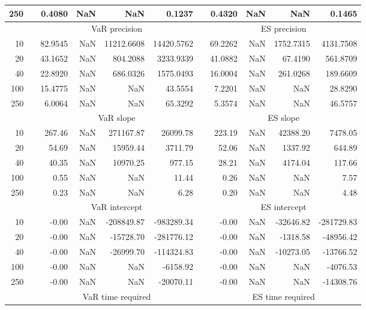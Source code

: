 {\begin{table}[h]
\begin{tabular}{rr rrrr r rrrr}
250 && 0.4080  &    NaN  &    NaN & 0.1237 && 0.4320  &    NaN  &    NaN & 0.1465 \\ 
\hline 
 & & \multicolumn{4}{c}{VaR precision} &&  \multicolumn{4}{c}{ES precision} \\ \cline{3-6}  \cline{8-11}
10 && 82.9545  &    NaN  & 11212.6608 & 14420.5762 & & 69.2262  &    NaN  & 1752.7315 & 4131.7508 \\ 
20 && 43.1652  &    NaN  & 804.2088 & 3233.9339 & & 41.0882  &    NaN  & 67.4190 & 561.8709 \\ 
40 && 22.8920  &    NaN  & 686.0326 & 1575.0493 & & 16.0004  &    NaN  & 261.0268 & 189.6609 \\ 
100 && 15.4775  &    NaN  &    NaN & 43.5554 & & 7.2201  &    NaN  &    NaN & 28.8290 \\ 
250 && 6.0064  &    NaN  &    NaN & 65.3292 & & 5.3574  &    NaN  &    NaN & 46.5757 \\ 
\hline 
 & & \multicolumn{4}{c}{ VaR slope} &&  \multicolumn{4}{c}{ES slope} \\ \cline{3-6}  \cline{8-11}
10 && 267.46  &  NaN  & 271167.87 & 26099.78 && 223.19  &  NaN  & 42388.20 & 7478.05 \\ 
20 && 54.69  &  NaN  & 15959.44 & 3711.79 && 52.06  &  NaN  & 1337.92 & 644.89 \\ 
40 && 40.35  &  NaN  & 10970.25 & 977.15 && 28.21  &  NaN  & 4174.04 & 117.66 \\ 
100 && 0.55  &  NaN  &  NaN & 11.44 && 0.26  &  NaN  &  NaN & 7.57 \\ 
250 && 0.23  &  NaN  &  NaN & 6.28 && 0.20  &  NaN  &  NaN & 4.48 \\ 
\hline 
 & & \multicolumn{4}{c}{ VaR intercept} &&  \multicolumn{4}{c}{ES intercept} \\ \cline{3-6}  \cline{8-11}
10 && -0.00  &  NaN  & -208849.87 & -983289.34 && -0.00  &  NaN  & -32646.82 & -281729.83 \\ 
20 && -0.00  &  NaN  & -15728.70 & -281776.12 && -0.00  &  NaN  & -1318.58 & -48956.42 \\ 
40 && -0.00  &  NaN  & -26999.70 & -114324.83 && -0.00  &  NaN  & -10273.05 & -13766.52 \\ 
100 && -0.00  &  NaN  &  NaN & -6158.92 && -0.00  &  NaN  &  NaN & -4076.53 \\ 
250 && -0.00  &  NaN  &  NaN & -20070.11 && -0.00  &  NaN  &  NaN & -14308.76 \\ 
\hline 
 & & \multicolumn{4}{c}{VaR time required} && \multicolumn{4}{c}{ES time required} \\ \cline{3-6}  \cline{8-11}

\end{tabular}
\end{table}}

